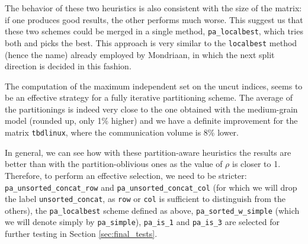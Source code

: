 The behavior of these two heuristics is also consistent with the size of the matrix: if one produces good results, the other performs much worse. This suggest us that these two schemes could be merged in a single method, \verb|pa_localbest|, which tries both and picks the best. This approach is very similar to the \verb|localbest| method (hence the name) already employed by Mondriaan, in which the next split direction is decided in this fashion.

The computation of the maximum independent set on the uncut indices, seems to be an effective strategy for a fully iterative partitioning scheme. The average of the partitionings is indeed very close to the one obtained with the medium-grain model (rounded up, only 1\% higher) and we have a definite improvement for the matrix \verb|tbdlinux|, where the communication volume is 8\% lower.

In general, we can see how with these partition-aware heuristics the results are better than with the partition-oblivious ones as the value of $\rho$ is closer to 1. Therefore, to perform an effective selection, we need to be stricter: \verb|pa_unsorted_concat_row| and \verb|pa_unsorted_concat_col| (for which we will drop the label \verb|unsorted_concat|, as \verb|row| or \verb|col| is sufficient to distinguish from the others), the \verb|pa_localbest| scheme defined as above, \verb|pa_sorted_w_simple| (which we will denote simply by \verb|pa_simple|), \verb|pa_is_1| and \verb|pa_is_3| are selected for further testing in Section \ref{sec:final_tests}.

